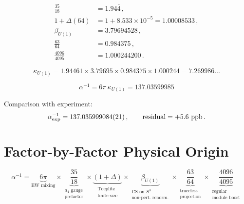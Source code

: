 \documentclass[12pt,a4paper]{article}
\theoremstyle{definition}
\begin{document}
\begin{align}
\frac{35}{18} &= 1.94\overline{4}\,, \\
1 + \Delta(64) &= 1 + 8.533 \times 10^{-5} = 1.00008533\,, \\
\beta_{U(1)} &= 3.79694528\,, \\
\frac{63}{64} &= 0.984375\,, \\
\frac{4096}{4095} &= 1.000244200\,.
\end{align}

\begin{equation}
\kappa_{U(1)} = 1.94461 \times 3.79695 \times 0.984375 \times 1.000244
= 7.269986\ldots
\end{equation}

\begin{equation}
\boxed{\alpha^{-1} = 6\pi\,\kappa_{U(1)} = 137.03599985}
\end{equation}

Comparison with experiment:
\begin{equation}
\alpha^{-1}_{\rm exp} = 137.035999084(21)\,,\qquad
\text{residual} = +5.6~\text{ppb}\,.
\end{equation}

\section{Factor-by-Factor Physical Origin}
\label{sec:factors}

\begin{equation}
\alpha^{-1} = \underbrace{6\pi}_{\text{EW mixing}}
\times \underbrace{\frac{35}{18}}_{\substack{a_4\text{ gauge}\\\text{prefactor}}}
\times \underbrace{(1 + \Delta)}_{\substack{\text{Toeplitz}\\\text{finite-size}}}
\times \underbrace{\beta_{U(1)}}_{\substack{\text{CS on }S^3\\\text{non-pert.\ renorm.}}}
\times \underbrace{\frac{63}{64}}_{\substack{\text{traceless}\\\text{projection}}}
\times \underbrace{\frac{4096}{4095}}_{\substack{\text{regular}\\\text{module boost}}}
\end{equation}
\end{document}

